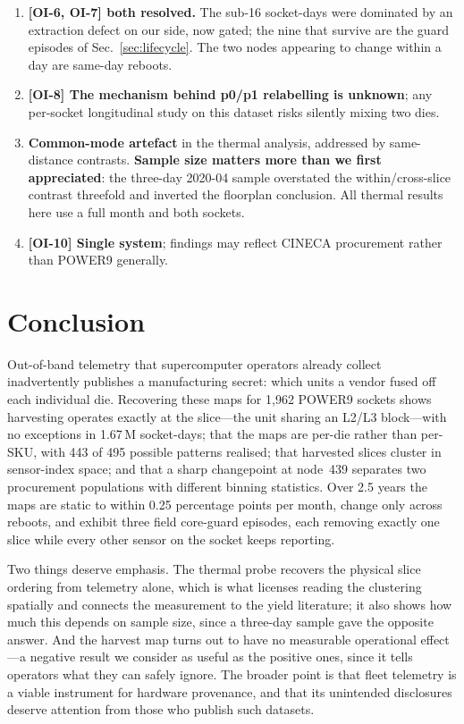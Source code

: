 \documentclass[10pt,conference]{IEEEtran}
\begin{document}
\begin{enumerate}
coverage filter does not drive any result: clean-day rates are near-identical between lots,
coverage is uncorrelated with the harvest pattern ($r=+0.004$, $p=0.88$), and restricting to
$\ge$90\,\% coverage leaves the lot contrast unchanged (Sec.~\ref{sec:lot}).
\item \textbf{[OI-6, OI-7] both resolved.} The sub-16 socket-days were dominated by an
extraction defect on our side, now gated; the nine that survive are the guard episodes of
Sec.~\ref{sec:lifecycle}. The two nodes appearing to change within a day are same-day reboots.
\item \textbf{[OI-8] The mechanism behind p0/p1 relabelling is unknown}; any per-socket
longitudinal study on this dataset risks silently mixing two dies.
\item \textbf{Common-mode artefact} in the thermal analysis, addressed by same-distance contrasts.
\textbf{Sample size matters more than we first appreciated}: the three-day 2020-04 sample
overstated the within/cross-slice contrast threefold and inverted the floorplan conclusion. All
thermal results here use a full month and both sockets.
\item \textbf{[OI-10] Single system}; findings may reflect CINECA procurement rather than POWER9
generally.
\end{enumerate}

\section{Conclusion}
Out-of-band telemetry that supercomputer operators already collect inadvertently publishes a
manufacturing secret: which units a vendor fused off each individual die. Recovering these maps for
1{,}962 POWER9 sockets shows harvesting operates exactly at the slice---the unit sharing an L2/L3
block---with no exceptions in 1.67\,M socket-days; that the maps are per-die rather than per-SKU,
with 443 of 495 possible patterns realised; that harvested slices cluster in sensor-index space;
and that a sharp changepoint at node~439 separates two procurement populations with different
binning statistics. Over 2.5 years the maps are static to within 0.25 percentage points per month,
change only across reboots, and exhibit three field core-guard episodes, each removing exactly one
slice while every other sensor on the socket keeps reporting.

Two things deserve emphasis. The thermal probe recovers the physical slice ordering from telemetry
alone, which is what licenses reading the clustering spatially and connects the measurement to the
yield literature; it also shows how much this depends on sample size, since a three-day sample gave
the opposite answer. And the harvest map turns out to have no measurable operational effect---a
negative result we consider as useful as the positive ones, since it tells operators what they can
safely ignore.
The broader point is that fleet telemetry is a viable instrument for hardware provenance, and that
its unintended disclosures deserve attention from those who publish such datasets.
\end{document}
